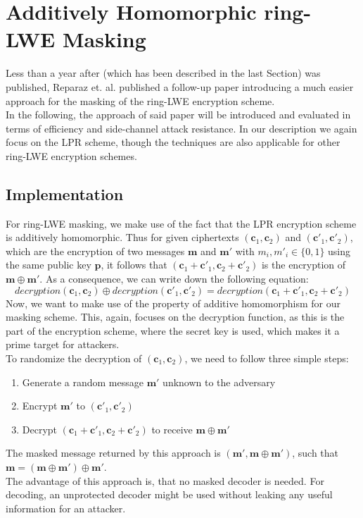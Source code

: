 %
%

\chapter{Additively Homomorphic ring-LWE Masking}
Less than a year after \cite{maskedRing} (which has been described in the last Section) was published, Reparaz et. al. published a follow-up paper \cite{Reparaz2016} introducing a much easier approach for the masking of the \ac{ring-LWE} encryption scheme.\\
In the following, the approach of said paper will be introduced and evaluated in terms of efficiency and side-channel attack resistance. In our description we again focus on the \ac{LPR} scheme, though the techniques are also applicable for other \ac{ring-LWE} encryption schemes.

\section{Implementation}
For \ac{ring-LWE} masking, we make use of the fact that the \ac{LPR} encryption scheme is additively homomorphic. Thus for given ciphertexts \((\textbf{c}_1, \textbf{c}_2)\) and \((\textbf{c}'_1, \textbf{c}'_2)\), which are the encryption of two messages \(\textbf{m}\) and \(\textbf{m}'\) with \(m_i, m'_i \in \{0,1\}\) using the same public key \(\textbf{p}\), it follows that \((\textbf{c}_1+\textbf{c}'_1, \textbf{c}_2+\textbf{c}'_2)\) is the encryption of \(\textbf{m} \oplus \textbf{m}'\). As a consequence, we can write down the following equation:
\begin{equation}
	decryption(\textbf{c}_1,\textbf{c}_2) \oplus decryption(\textbf{c}'_1,\textbf{c}'_2) = decryption(\textbf{c}_1 + \textbf{c}'_1,\textbf{c}_2 + \textbf{c}'_2)
\end{equation}
Now, we want to make use of the property of additive homomorphism for our masking scheme. This, again, focuses on the decryption function, as this is the part of the encryption scheme, where the secret key is used, which makes it a prime target for attackers.\\
To randomize the decryption of \((\textbf{c}_1, \textbf{c}_2)\), we need to follow three simple steps:
\begin{enumerate}
\item Generate a random message \(\textbf{m}'\) unknown to the adversary
\item Encrypt \(\textbf{m}'\) to \((\textbf{c}'_1, \textbf{c}'_2)\)
\item Decrypt \((\textbf{c}_1+\textbf{c}'_1, \textbf{c}_2+\textbf{c}'_2)\) to receive \(\textbf{m} \oplus \textbf{m}'\)
\end{enumerate}
The masked message returned by this approach is \((\textbf{m}', \textbf{m} \oplus \textbf{m}')\), such that \(\textbf{m} = (\textbf{m} \oplus \textbf{m}') \oplus \textbf{m}'\).\\
The advantage of this approach is, that no masked decoder is needed. For decoding, an unprotected decoder might be used without leaking any useful information for an attacker.


